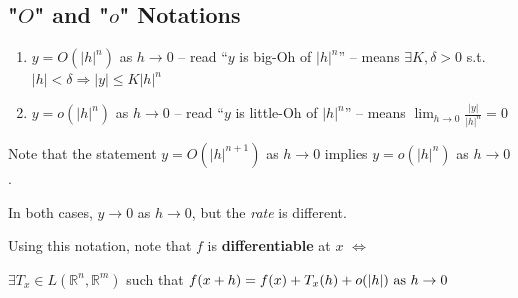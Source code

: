 \documentclass[11pt]{elegantbook}
\begin{document}
\subsection{"$O$" and "$o$" Notations}
\begin{definition}["$O$" and "$o$"]
    \normalfont
    \begin{enumerate}
        \item $y = O(|h|^n)$ as $h \rightarrow 0$ -- read “$y$ is big-Oh of $|h|^n$” -- means $\exists K, \delta > 0$ s.t. $|h| < \delta \Rightarrow |y| \leq K|h|^n$
        \item $y = o(|h|^n)$ as $h \rightarrow 0$ -- read “$y$ is little-Oh of $|h|^n$” -- means $\lim_{h \rightarrow 0}\frac{|y|}{|h|^n}=0$
    \end{enumerate}
\end{definition}
\begin{note}
    Note that the statement $y = O(|h|^{n+1})$ as $h \rightarrow 0$ implies $y = o(|h|^n)$ as $h \rightarrow 0$.
\end{note}
In both cases, $y \rightarrow 0$ as $h \rightarrow 0$, but the \textit{rate} is different.

\begin{definition}
    \normalfont
    Using this notation, note that $f$ is \textbf{differentiable} at $x$ $\Leftrightarrow$
    \begin{center}
        $\exists T_x\in L(\mathbb{R}^n,\mathbb{R}^m)$ such that $f(x+h)=f(x)+T_x(h)+o(|h|)\textnormal{ as }h \rightarrow 0$
    \end{center}
\end{definition}
\end{document}
